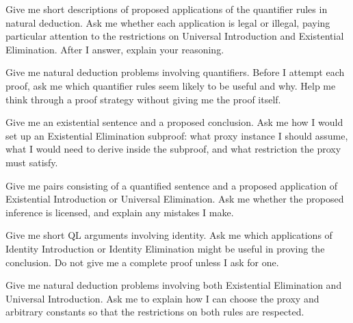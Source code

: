%
%


\begin{genaipractice}[]

\item Give me short descriptions of proposed applications of the quantifier rules in natural deduction. Ask me whether each application is legal or illegal, paying particular attention to the restrictions on Universal Introduction and Existential Elimination. After I answer, explain your reasoning.

\item Give me natural deduction problems involving quantifiers. Before I attempt each proof, ask me which quantifier rules seem likely to be useful and why. Help me think through a proof strategy without giving me the proof itself.

\item Give me an existential sentence and a proposed conclusion. Ask me how I would set up an Existential Elimination subproof: what proxy instance I should assume, what I would need to derive inside the subproof, and what restriction the proxy must satisfy.

\item Give me pairs consisting of a quantified sentence and a proposed application of Existential Introduction or Universal Elimination. Ask me whether the proposed inference is licensed, and explain any mistakes I make.

\item Give me short QL arguments involving identity. Ask me which applications of Identity Introduction or Identity Elimination might be useful in proving the conclusion. Do not give me a complete proof unless I ask for one.

\item Give me natural deduction problems involving both Existential Elimination and Universal Introduction. Ask me to explain how I can choose the proxy and arbitrary constants so that the restrictions on both rules are respected.

\end{genaipractice}
